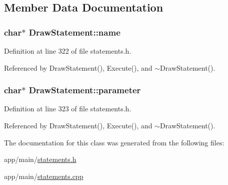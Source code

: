 \subsection{Member Data Documentation}
\subsubsection[{\texorpdfstring{name}{name}}]{\setlength{\rightskip}{0pt plus 5cm}char$\ast$ Draw\+Statement\+::name\hspace{0.3cm}{\ttfamily [private]}}\hypertarget{classDrawStatement_a3f94d0d8039a4a683bc0631fc27c6f4c}{}\label{classDrawStatement_a3f94d0d8039a4a683bc0631fc27c6f4c}


Definition at line 322 of file statements.\+h.



Referenced by Draw\+Statement(), Execute(), and $\sim$\+Draw\+Statement().

\subsubsection[{\texorpdfstring{parameter}{parameter}}]{\setlength{\rightskip}{0pt plus 5cm}char$\ast$ Draw\+Statement\+::parameter\hspace{0.3cm}{\ttfamily [private]}}\hypertarget{classDrawStatement_a56f4d974e2408e03e1722c319238e7cf}{}\label{classDrawStatement_a56f4d974e2408e03e1722c319238e7cf}


Definition at line 323 of file statements.\+h.



Referenced by Draw\+Statement(), Execute(), and $\sim$\+Draw\+Statement().



The documentation for this class was generated from the following files\+:\begin{DoxyCompactItemize}
\item 
app/main/\hyperlink{statements_8h}{statements.\+h}\item 
app/main/\hyperlink{statements_8cpp}{statements.\+cpp}\end{DoxyCompactItemize}
